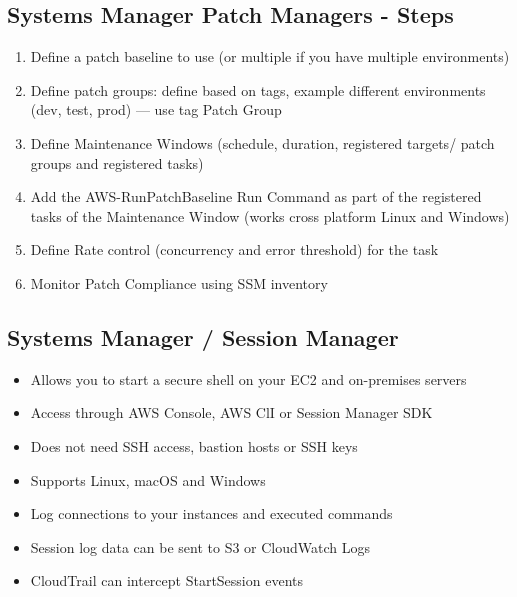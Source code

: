\subsection{Systems Manager Patch Managers - Steps}
\begin{enumerate}
    \item Define a patch baseline to use (or multiple if you have multiple environments)
    \item Define patch groups: define based on tags, example different environments (dev, test, prod) --- use tag Patch Group
    \item Define Maintenance Windows (schedule, duration, registered targets/ patch groups and registered tasks)
    \item Add the AWS-RunPatchBaseline Run Command as part of the registered tasks of the Maintenance Window (works cross platform Linux and Windows)
    \item Define Rate control (concurrency and error threshold) for the task
    \item Monitor Patch Compliance using SSM inventory
\end{enumerate}

\subsection{Systems Manager / Session Manager}
\begin{itemize}
    \item Allows you to start a secure shell on your EC2 and on-premises servers
    \item Access through AWS Console, AWS ClI or Session Manager SDK
    \item Does not need SSH access, bastion hosts or SSH keys
    \item Supports Linux, macOS and Windows
    \item Log connections to your instances and executed commands
    \item Session log data can be sent to S3 or CloudWatch Logs
    \item CloudTrail can intercept StartSession events
\end{itemize}

